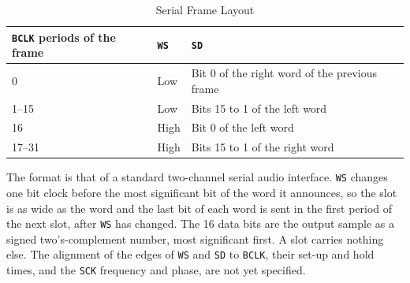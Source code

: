 \begin{table}[H]
	\centering
	\begin{tabular}{llp{6.4cm}}
		\toprule
		\textbf{\texttt{BCLK} periods of the frame} & \textbf{\texttt{WS}} & \textbf{\texttt{SD}}                          \\
		\midrule
		0                                           & Low                  & Bit 0 of the right word of the previous frame \\
		1--15                                       & Low                  & Bits 15 to 1 of the left word                 \\
		16                                          & High                 & Bit 0 of the left word                        \\
		17--31                                      & High                 & Bits 15 to 1 of the right word                \\
		\bottomrule
	\end{tabular}
	\caption{Serial Frame Layout}
	\label{tab:serial-frame}
\end{table}

The format is that of a standard two-channel serial audio interface. \texttt{WS} changes one bit clock before the most
significant bit of the word it announces, so the slot is as wide as the word and the last bit of each word is sent in
the first period of the next slot, after \texttt{WS} has changed. The 16 data bits are the output sample as a signed
two's-complement number, most significant first. A slot carries nothing else. The alignment of the edges of \texttt{WS}
and \texttt{SD} to \texttt{BCLK}, their set-up and hold times, and the \texttt{SCK} frequency and phase, are not yet
specified.
